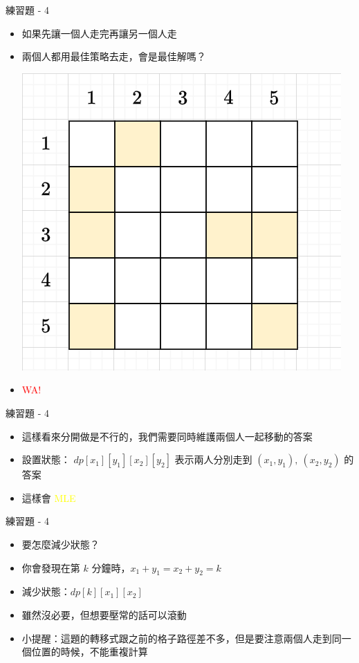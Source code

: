 \documentclass[aspectratio=169]{beamer}
\begin{document}
    \begin{frame}{練習題 - 4}
        \begin{itemize}
            \item 如果先讓一個人走完再讓另一個人走
            \item 兩個人都用最佳策略去走，會是最佳解嗎？
            \begin{center}
                \includegraphics[scale=0.5]{images/treasure_counterexample.png}
            \end{center}
            \item<2-> \textcolor{red}{WA!}
        \end{itemize}
    \end{frame}

    \begin{frame}{練習題 - 4}
        \begin{itemize}
            \item 這樣看來分開做是不行的，我們需要同時維護兩個人一起移動的答案
            \item<2-> 設置狀態： $dp[x_1][y_1][x_2][y_2]$ 表示兩人分別走到 $(x_1,y_1), \ (x_2,y_2)$ 的答案
            \item<3-> 這樣會 \textcolor{yellow}{MLE}
        \end{itemize}
    \end{frame}

    \begin{frame}{練習題 - 4}
        \begin{itemize}
            \item 要怎麼減少狀態？
            \item<2-> 你會發現在第 $k$ 分鐘時，$x_1+y_1=x_2+y_2=k$
            \item<3-> 減少狀態：$dp[k][x_1][x_2]$
            \item<4-> 雖然沒必要，但想要壓常的話可以滾動
            \item<5-> 小提醒：這題的轉移式跟之前的格子路徑差不多，但是要注意兩個人走到同一個位置的時候，不能重複計算
        \end{itemize}
    \end{frame}
    
\end{document}
